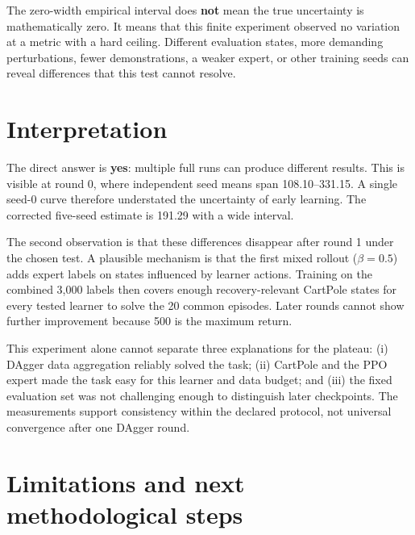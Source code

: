 \documentclass[11pt]{article}
\begin{document}
The zero-width empirical interval does \textbf{not} mean the true uncertainty is mathematically zero. It means that this finite experiment observed no variation at a metric with a hard ceiling. Different evaluation states, more demanding perturbations, fewer demonstrations, a weaker expert, or other training seeds can reveal differences that this test cannot resolve.

\section{Interpretation}

The direct answer is \textbf{yes}: multiple full runs can produce different results. This is visible at round 0, where independent seed means span 108.10--331.15. A single seed-0 curve therefore understated the uncertainty of early learning. The corrected five-seed estimate is 191.29 with a wide interval.

The second observation is that these differences disappear after round 1 under the chosen test. A plausible mechanism is that the first mixed rollout ($\beta=0.5$) adds expert labels on states influenced by learner actions. Training on the combined 3,000 labels then covers enough recovery-relevant CartPole states for every tested learner to solve the 20 common episodes. Later rounds cannot show further improvement because 500 is the maximum return.

This experiment alone cannot separate three explanations for the plateau: (i) DAgger data aggregation reliably solved the task; (ii) CartPole and the PPO expert made the task easy for this learner and data budget; and (iii) the fixed evaluation set was not challenging enough to distinguish later checkpoints. The measurements support consistency within the declared protocol, not universal convergence after one DAgger round.

\section{Limitations and next methodological steps}
\end{document}
